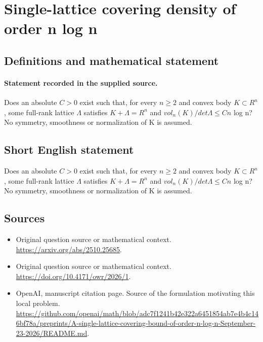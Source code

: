 \documentclass[11pt]{article}
\begin{document}
\section*{Single-lattice covering density of order n log n}\label{30007127}
\subsection{Definitions and mathematical statement}
\paragraph{Statement recorded in the supplied source.}
Does an absolute $C>0$ exist such that, for every $n\geq 2$ and convex body $K\subset R^{n}$, some full-rank lattice $\Lambda $ satisfies $K+\Lambda =R^{n}$ and $vol_n(K)/det\Lambda \leq Cn$ log n? No symmetry, smoothness or normalization of K is assumed.
\subsection{Short English statement}
Does an absolute $C>0$ exist such that, for every $n\geq 2$ and convex body $K\subset R^{n}$, some full-rank lattice $\Lambda $ satisfies $K+\Lambda =R^{n}$ and $vol_n(K)/det\Lambda \leq Cn$ log n? No symmetry, smoothness or normalization of K is assumed.
\subsection{Sources}
\begin{itemize}
\item[S1] Original question source or mathematical context.
\url{https://arxiv.org/abs/2510.25685}.
\item[S2] Original question source or mathematical context.
\url{https://doi.org/10.4171/owr/2026/1}.
\item[S3] OpenAI, manuscript citation page. Source of the formulation motivating this local problem.
\url{https://github.com/openai/math/blob/adc7f1241b42e322a6451854ab7e4b4c146bf78a/preprints/A-single-lattice-covering-bound-of-order-n-log-n-September-23-2026/README.md}.
\end{itemize}
\end{document}
